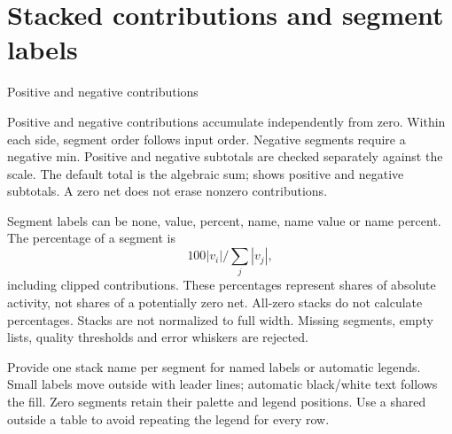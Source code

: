 \section{Stacked contributions and segment labels}
\begin{demo}{Positive and negative contributions}
\end{demo}
Positive and negative contributions accumulate independently from zero. Within
each side, segment order follows input order. Negative segments require a negative
min. Positive and negative subtotals are checked separately against the scale.
The default total is the algebraic sum;  shows positive
and negative subtotals. A zero net does not erase nonzero contributions.

Segment labels can be none, value, percent, name, name value or name percent.
The percentage of a segment is
\[100|v_i|/\sum_j|v_j|,\]
including clipped contributions. These percentages
represent shares of absolute activity, not shares of a potentially zero net.
All-zero stacks do not calculate percentages. Stacks are not normalized to full
width. Missing segments, empty lists, quality thresholds and error whiskers are rejected.

Provide one stack name per segment for named labels or automatic legends.
Small labels move outside with leader lines; automatic black/white text follows
the fill. Zero segments retain their palette and legend positions. Use a shared
\key{\gradbarslegend} outside a table to avoid repeating the legend for every row.

